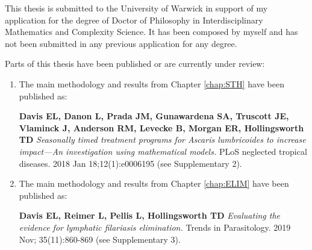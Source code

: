 \documentclass[11pt,a4paper]{report}      %
\begin{document}
\begin{thesisdeclaration}
This thesis is submitted to the University of Warwick in support of my application for the degree of Doctor of Philosophy in Interdisciplinary Mathematics and Complexity Science. It has been composed by myself and has not been submitted in any previous application for any degree.

Parts of this thesis have been published or are currently under review: 
\begin{enumerate}
\item The main methodology and results from Chapter \ref{chap:STH} have been published as: 

\textbf{Davis EL, Danon L, Prada JM, Gunawardena SA, Truscott JE, Vlaminck J, Anderson RM, Levecke B, Morgan ER, Hollingsworth TD} \textit{Seasonally timed treatment programs for Ascaris lumbricoides to increase impact—An investigation using mathematical models.} PLoS neglected tropical diseases. 2018 Jan 18;12(1):e0006195 (see Supplementary 2).

\item The main methodology and results from Chapter \ref{chap:ELIM} have been published as: 

\textbf{Davis EL, Reimer L, Pellis L, Hollingsworth TD} \textit{Evaluating the evidence for lymphatic filariasis elimination.} Trends in Parasitology. 2019 Nov; 35(11):860-869 (see Supplementary 3).
\end{enumerate}
\end{thesisdeclaration}
\end{document}
